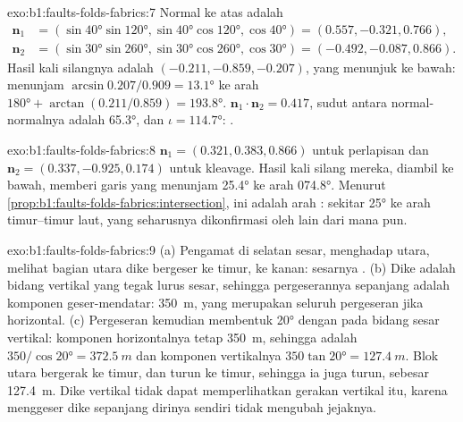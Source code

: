 \begin{solution}{exo:b1:faults-folds-fabrics:7}
Normal ke atas adalah
\begin{align*}
  \mathbf n_1 &= (\sin\ang{40}\sin\ang{120}, \sin\ang{40}\cos\ang{120}, \cos\ang{40}) = (0.557, -0.321, 0.766),\\
  \mathbf n_2 &= (\sin\ang{30}\sin\ang{260}, \sin\ang{30}\cos\ang{260}, \cos\ang{30}) = (-0.492, -0.087, 0.866).
\end{align*}
Hasil kali silangnya adalah $(-0.211, -0.859, -0.207)$, yang menunjuk ke bawah:  menunjam $\arcsin 0.207/0.909 = \ang{13.1}$ ke arah $\ang{180} + \arctan(0.211/0.859) =
\ang{193.8}$. $\mathbf n_1\cdot\mathbf n_2 = 0.417$, sudut antara normal-normalnya adalah \ang{65.3}, dan $\iota = \ang{114.7}$: .
\end{solution}

\begin{solution}{exo:b1:faults-folds-fabrics:8}
$\mathbf n_1 = (0.321, 0.383, 0.866)$ untuk perlapisan dan
$\mathbf n_2 = (0.337, -0.925, 0.174)$ untuk kleavage. Hasil kali silang mereka, diambil ke bawah, memberi garis yang menunjam \ang{25.4} ke arah \ang{074.8}. Menurut
\cref{prop:b1:faults-folds-fabrics:intersection}, ini adalah arah :  sekitar \ang{25} ke arah timur--timur laut, yang seharusnya dikonfirmasi oleh  lain dari  mana pun.
\end{solution}

\begin{solution}{exo:b1:faults-folds-fabrics:9}
(a) Pengamat di selatan sesar, menghadap utara, melihat bagian utara dike bergeser ke timur, ke kanan: sesarnya . (b) Dike adalah bidang vertikal yang tegak lurus sesar, sehingga pergeserannya sepanjang  adalah komponen geser-mendatar: \qty{350}{m}, yang merupakan seluruh pergeseran jika  horizontal. (c) Pergeseran kemudian membentuk \ang{20} dengan  pada bidang sesar vertikal: komponen horizontalnya tetap \qty{350}{m}, sehingga  adalah $350/\cos\ang{20} = \qty{372.5}{m}$ dan komponen vertikalnya $350\tan\ang{20} = \qty{127.4}{m}$. Blok utara bergerak ke timur, dan  turun ke timur, sehingga ia juga turun, sebesar \qty{127.4}{m}. Dike vertikal tidak dapat memperlihatkan gerakan vertikal itu, karena menggeser dike sepanjang dirinya sendiri tidak mengubah jejaknya.
\end{solution}

